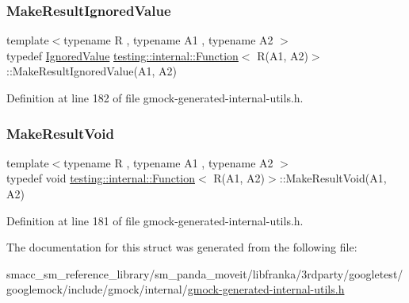 \subsubsection{\texorpdfstring{Make\+Result\+Ignored\+Value}{MakeResultIgnoredValue}}
{\footnotesize\ttfamily template$<$typename R , typename A1 , typename A2 $>$ \\
typedef \hyperlink{classtesting_1_1internal_1_1IgnoredValue}{Ignored\+Value} \hyperlink{structtesting_1_1internal_1_1Function}{testing\+::internal\+::\+Function}$<$ R(A1, A2)$>$\+::Make\+Result\+Ignored\+Value(A1, A2)}



Definition at line 182 of file gmock-\/generated-\/internal-\/utils.\+h.

\mbox{\label{structtesting_1_1internal_1_1Function_3_01R_07A1_00_01A2_08_4_ada1ad22fa21c84ec3faea47ed20c1b46}} 
\subsubsection{\texorpdfstring{Make\+Result\+Void}{MakeResultVoid}}
{\footnotesize\ttfamily template$<$typename R , typename A1 , typename A2 $>$ \\
typedef void \hyperlink{structtesting_1_1internal_1_1Function}{testing\+::internal\+::\+Function}$<$ R(A1, A2)$>$\+::Make\+Result\+Void(A1, A2)}



Definition at line 181 of file gmock-\/generated-\/internal-\/utils.\+h.



The documentation for this struct was generated from the following file\+:\begin{DoxyCompactItemize}
\item 
smacc\+\_\+sm\+\_\+reference\+\_\+library/sm\+\_\+panda\+\_\+moveit/libfranka/3rdparty/googletest/googlemock/include/gmock/internal/\hyperlink{gmock-generated-internal-utils_8h}{gmock-\/generated-\/internal-\/utils.\+h}\end{DoxyCompactItemize}
